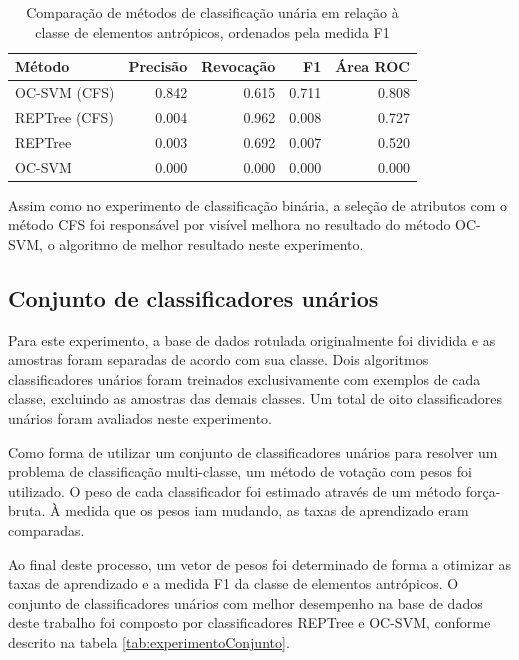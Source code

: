 \begin{table}[h]
\centering
\begin{tabulary}{\linewidth}{|L|R|R|R|R|}
\hline
\textbf{Método} & \textbf{Precisão} & \textbf{Revocação} & \textbf{F1} & \textbf{Área ROC} \\ \hline
OC-SVM (CFS)  & 0.842 & 0.615 & 0.711 & 0.808 \\ \hline
REPTree (CFS) & 0.004 & 0.962 & 0.008 & 0.727 \\ \hline
REPTree       & 0.003 & 0.692 & 0.007 & 0.520 \\ \hline
OC-SVM        & 0.000 & 0.000 & 0.000 & 0.000 \\ \hline
\end{tabulary}
\caption{Comparação de métodos de classificação unária em relação à classe de elementos antrópicos, ordenados pela medida F1}
\label{tab:experimentoUniclasseAntropico}
\end{table}

Assim como no experimento de classificação binária, a seleção de atributos com o método CFS foi responsável por visível melhora no resultado do método OC-SVM, o algoritmo de melhor resultado neste experimento.

\subsection{Conjunto de classificadores unários}

Para este experimento, a base de dados rotulada originalmente foi dividida e as amostras foram separadas de acordo com sua classe. Dois algoritmos classificadores unários foram treinados exclusivamente com exemplos de cada classe, excluindo as amostras das demais classes. Um total de oito classificadores unários foram avaliados neste experimento.

Como forma de utilizar um conjunto de classificadores unários para resolver um problema de classificação multi-classe, um método de votação com pesos foi utilizado. O peso de cada classificador foi estimado através de um método força-bruta. À medida que os pesos iam mudando, as taxas de aprendizado eram comparadas.

Ao final deste processo, um vetor de pesos foi determinado de forma a otimizar as taxas de aprendizado e a medida F1 da classe de elementos antrópicos. O conjunto de classificadores unários com melhor desempenho na base de dados deste trabalho foi composto por classificadores REPTree e OC-SVM, conforme descrito na tabela \ref{tab:experimentoConjunto}.

